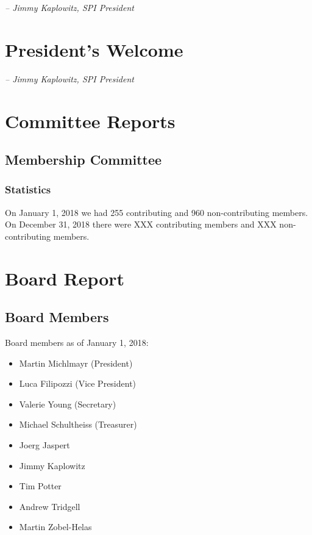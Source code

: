\documentclass[a4paper]{report}
\begin{document}
  \emph{-- Jimmy Kaplowitz, SPI President}

\newpage

\tableofcontents

\newpage

\chapter{President's Welcome}
\label{sec:president}

  \emph{-- Jimmy Kaplowitz, SPI President}

\chapter{Committee Reports}
\section{Membership Committee}

\subsection{Statistics}

On January 1, 2018 we had 255 contributing and 960 non-contributing
members.  On December 31, 2018 there were XXX contributing members and
XXX non-contributing members.

\chapter{Board Report}
\section{Board Members}

Board members as of January 1, 2018:

\begin{itemize}
\item Martin Michlmayr (President)
\item Luca Filipozzi (Vice President)
\item Valerie Young (Secretary)
\item Michael Schultheiss (Treasurer)
\item Joerg Jaspert
\item Jimmy Kaplowitz
\item Tim Potter
\item Andrew Tridgell
\item Martin Zobel-Helas
\end{itemize}
\end{document}
